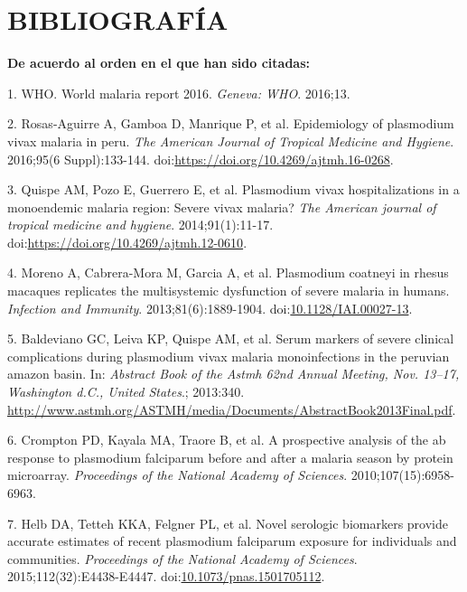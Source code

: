 \documentclass[]{article}
\begin{document}
\section{BIBLIOGRAFÍA}\label{bibliografia}

\textbf{De acuerdo al orden en el que han sido citadas:}

\hypertarget{refs}{}
\hypertarget{ref-WHO2016world}{}
1. WHO. World malaria report 2016. \emph{Geneva: WHO}. 2016;13.

\hypertarget{ref-rosas2016peru}{}
2. Rosas-Aguirre A, Gamboa D, Manrique P, et al. Epidemiology of
plasmodium vivax malaria in peru. \emph{The American Journal of Tropical
Medicine and Hygiene}. 2016;95(6 Suppl):133-144.
doi:\href{https://doi.org/https://doi.org/10.4269/ajtmh.16-0268}{https://doi.org/10.4269/ajtmh.16-0268}.

\hypertarget{ref-quispe2014}{}
3. Quispe AM, Pozo E, Guerrero E, et al. Plasmodium vivax
hospitalizations in a monoendemic malaria region: Severe vivax malaria?
\emph{The American journal of tropical medicine and hygiene}.
2014;91(1):11-17.
doi:\href{https://doi.org/https://doi.org/10.4269/ajtmh.12-0610}{https://doi.org/10.4269/ajtmh.12-0610}.

\hypertarget{ref-Moreno2013}{}
4. Moreno A, Cabrera-Mora M, Garcia A, et al. Plasmodium coatneyi in
rhesus macaques replicates the multisystemic dysfunction of severe
malaria in humans. \emph{Infection and Immunity}. 2013;81(6):1889-1904.
doi:\href{https://doi.org/10.1128/IAI.00027-13}{10.1128/IAI.00027-13}.

\hypertarget{ref-baldevi2013}{}
5. Baldeviano GC, Leiva KP, Quispe AM, et al. Serum markers of severe
clinical complications during plasmodium vivax malaria monoinfections in
the peruvian amazon basin. In: \emph{Abstract Book of the Astmh 62nd
Annual Meeting, Nov. 13--17, Washington d.C., United States}.; 2013:340.
\url{http://www.astmh.org/ASTMH/media/Documents/AbstractBook2013Final.pdf}.

\hypertarget{ref-crompton2010}{}
6. Crompton PD, Kayala MA, Traore B, et al. A prospective analysis of
the ab response to plasmodium falciparum before and after a malaria
season by protein microarray. \emph{Proceedings of the National Academy
of Sciences}. 2010;107(15):6958-6963.

\hypertarget{ref-Helb2015exposure}{}
7. Helb DA, Tetteh KKA, Felgner PL, et al. Novel serologic biomarkers
provide accurate estimates of recent plasmodium falciparum exposure for
individuals and communities. \emph{Proceedings of the National Academy
of Sciences}. 2015;112(32):E4438-E4447.
doi:\href{https://doi.org/10.1073/pnas.1501705112}{10.1073/pnas.1501705112}.
\end{document}
